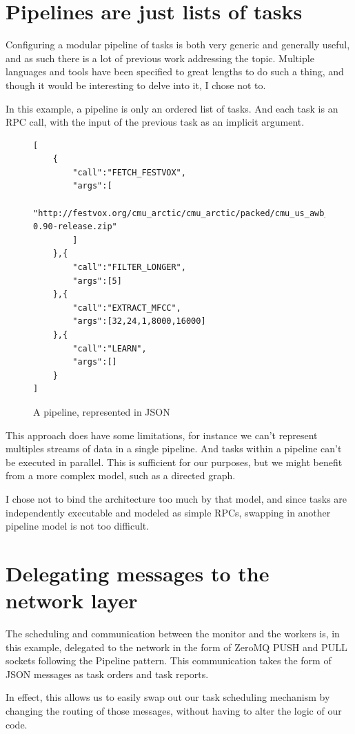 \documentclass[12pt, a4paper]{article}
\begin{document}
\section{Pipelines are just lists of tasks}

Configuring a modular pipeline of tasks is both very generic and generally useful, and as such
there is a lot of previous work addressing the topic.
Multiple languages and tools have been specified to great lengths to do such a thing,
and though it would be interesting to delve into it, I chose not to.

In this example, a pipeline is only an ordered list of tasks.
And each task is an RPC call, with the input of the previous task as an implicit argument.
\begin{figure}[htpb]
    \centering
    \begin{lstlisting}
[
    {
        "call":"FETCH_FESTVOX",
        "args":[
          "http://festvox.org/cmu_arctic/cmu_arctic/packed/cmu_us_awb_arctic-0.90-release.zip"
        ]
    },{
        "call":"FILTER_LONGER",
        "args":[5]
    },{
        "call":"EXTRACT_MFCC",
        "args":[32,24,1,8000,16000]
    },{
        "call":"LEARN",
        "args":[]
    }
]
    \end{lstlisting}
    \caption{A pipeline, represented in JSON}
\end{figure}

This approach does have some limitations, for instance we can't represent multiples streams of data
in a single pipeline. And tasks within a pipeline can't be executed in parallel.
This is sufficient for our purposes, but we might benefit from a more complex model, such as a directed graph.

I chose not to bind the architecture too much by that model,
and since tasks are independently executable and modeled as simple RPCs, swapping in another pipeline model is not too difficult.

\section{Delegating messages to the network layer}

The scheduling and communication between the monitor and the workers is, in this example, delegated
to the network in the form of ZeroMQ PUSH and PULL sockets following the Pipeline pattern.
This communication takes the form of JSON messages as task orders and task reports.


In effect, this allows us to easily swap out our task scheduling mechanism by changing the routing
of those messages, without having to alter the logic of our code.
\end{document}
